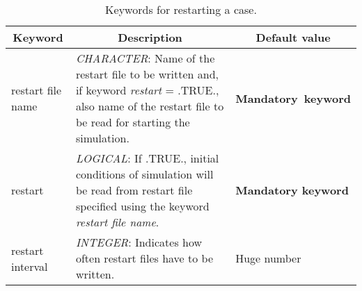 \documentclass[a4paper,10pt]{report}
\begin{document}
\begin{table}[htbp]
\caption{Keywords for restarting a case.}
\begin{tabular}{|l|p{10cm}|p{2cm}|}
\hline
\multicolumn{1}{|c|}{Keyword} & \multicolumn{1}{c|}{Description} & \multicolumn{1}{c|}{Default value} \\ \hline
restart file name   & \textit{CHARACTER}: Name of the restart file to be written and, if keyword \textit{restart} = .TRUE., also name of the restart file to be read for starting the simulation. & \textbf{Mandatory\ keyword} \\ \hline
restart 			& \textit{LOGICAL}: If .TRUE., initial conditions of simulation will be read from restart file specified using the keyword \textit{restart file name}. & \textbf{Mandatory keyword} \\ \hline
restart interval    & \textit{INTEGER}: Indicates how often restart files have to be written. & Huge number \\ \hline
\end{tabular}
\label{tab:restartkey}
\end{table}






\end{document}
